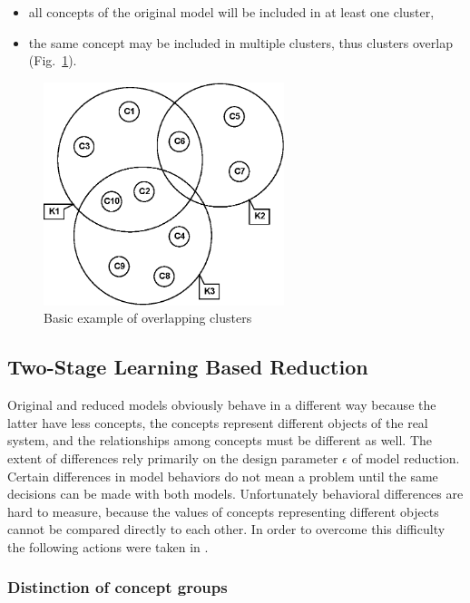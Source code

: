 \documentclass[graybox]{svmult}
\begin{document}
\begin{itemize}
  \item all concepts of the original model will be included in at least one cluster, 
  \item the same concept may be included in multiple clusters, thus 
  clusters overlap (Fig.~\ref{fig:overlapping}).
\end{itemize}

\begin{figure}[hbt]
  \sidecaption
  \includegraphics[width=7cm]{clusters.eps}
  \caption{Basic example of overlapping clusters \cite{hatwagnerm.f.koczyl.t.2015}}
  \label{fig:overlapping}
\end{figure}

\subsection{Two-Stage Learning Based Reduction}
\label{sec:2stage}

Original and reduced models obviously behave in a different way 
because the latter have less concepts, the concepts 
represent different objects of the real system, and the 
relationships among concepts must be different as well. The extent 
of differences rely primarily on the design parameter $\epsilon$ of 
model reduction. Certain differences in model behaviors do not mean 
a problem until the same decisions can be made with both models. 
Unfortunately behavioral differences are hard to measure, because 
the values of concepts representing different objects cannot be 
compared directly to each other. In order to overcome this difficulty the 
following actions were taken in \cite{hatwagner2018two}.

\subsubsection{Distinction of concept groups}
\label{sec:conceptGroups}
\end{document}
